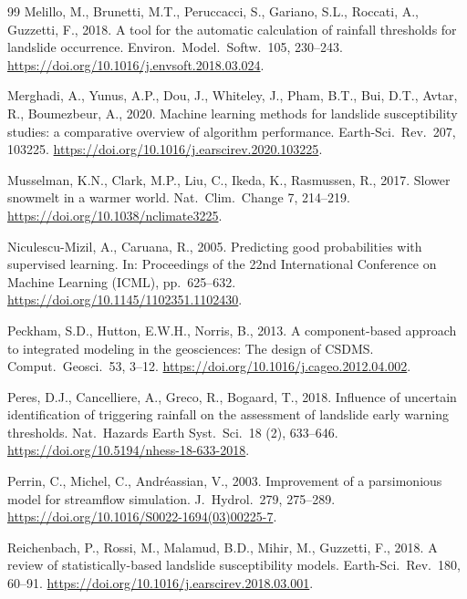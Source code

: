 \documentclass[authoryear,preprint,review,12pt]{elsarticle}
\begin{document}
\begin{thebibliography}{99}
Melillo, M., Brunetti, M.T., Peruccacci, S., Gariano, S.L., Roccati, A.,
Guzzetti, F., 2018. A tool for the automatic calculation of rainfall thresholds
for landslide occurrence. Environ.\ Model.\ Softw.\ 105, 230--243.
\url{https://doi.org/10.1016/j.envsoft.2018.03.024}.

Merghadi, A., Yunus, A.P., Dou, J., Whiteley, J., Pham, B.T., Bui, D.T., Avtar,
R., Boumezbeur, A., 2020. Machine learning methods for landslide susceptibility
studies: a comparative overview of algorithm performance. Earth-Sci.\ Rev.\ 207,
103225. \url{https://doi.org/10.1016/j.earscirev.2020.103225}.

Musselman, K.N., Clark, M.P., Liu, C., Ikeda, K., Rasmussen, R., 2017. Slower
snowmelt in a warmer world. Nat.\ Clim.\ Change 7, 214--219.
\url{https://doi.org/10.1038/nclimate3225}.

Niculescu-Mizil, A., Caruana, R., 2005. Predicting good probabilities with
supervised learning. In: Proceedings of the 22nd International Conference on
Machine Learning (ICML), pp.\ 625--632.
\url{https://doi.org/10.1145/1102351.1102430}.

Peckham, S.D., Hutton, E.W.H., Norris, B., 2013. A component-based approach to
integrated modeling in the geosciences: The design of CSDMS. Comput.\ Geosci.\
53, 3--12. \url{https://doi.org/10.1016/j.cageo.2012.04.002}.

Peres, D.J., Cancelliere, A., Greco, R., Bogaard, T., 2018. Influence of
uncertain identification of triggering rainfall on the assessment of landslide
early warning thresholds. Nat.\ Hazards Earth Syst.\ Sci.\ 18 (2), 633--646.
\url{https://doi.org/10.5194/nhess-18-633-2018}.

Perrin, C., Michel, C., Andr\'eassian, V., 2003. Improvement of a parsimonious
model for streamflow simulation. J.\ Hydrol.\ 279, 275--289.
\url{https://doi.org/10.1016/S0022-1694(03)00225-7}.

Reichenbach, P., Rossi, M., Malamud, B.D., Mihir, M., Guzzetti, F., 2018. A review
of statistically-based landslide susceptibility models. Earth-Sci.\ Rev.\ 180,
60--91. \url{https://doi.org/10.1016/j.earscirev.2018.03.001}.


\end{thebibliography}
\end{document}
